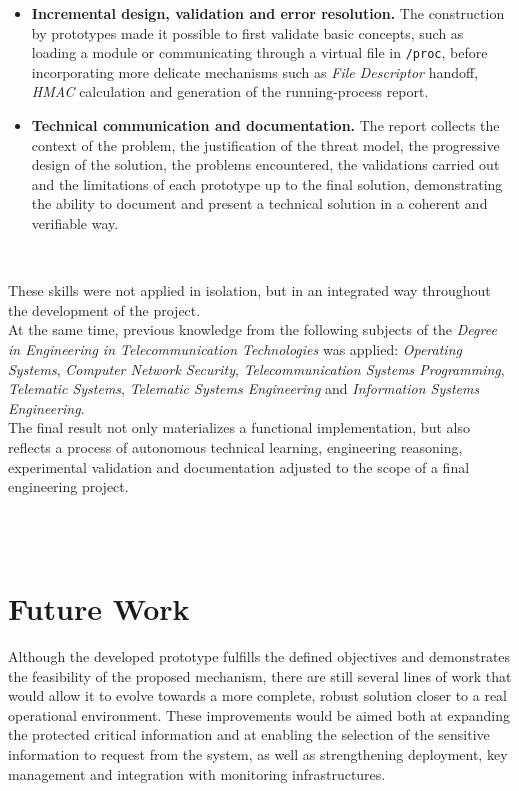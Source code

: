 \begin{itemize}
    \item \textbf{Incremental design, validation and error resolution.} The construction by prototypes made it possible to first validate basic concepts, such as loading a module or communicating through a virtual file in \texttt{/proc}, before incorporating more delicate mechanisms such as \textit{File Descriptor} handoff, \textit{HMAC} calculation and generation of the running-process report.
    
    \item \textbf{Technical communication and documentation.} The report collects the context of the problem, the justification of the threat model, the progressive design of the solution, the problems encountered, the validations carried out and the limitations of each prototype up to the final solution, demonstrating the ability to document and present a technical solution in a coherent and verifiable way.
\end{itemize}

\

These skills were not applied in isolation, but in an integrated way throughout the development of the project.\\

At the same time, previous knowledge from the following subjects of the \textit{Degree in Engineering in Telecommunication Technologies} was applied: \textit{Operating Systems}, \textit{Computer Network Security}, \textit{Telecommunication Systems Programming}, \textit{Telematic Systems}, \textit{Telematic Systems Engineering} and \textit{Information Systems Engineering}.\\

The final result not only materializes a functional implementation, but also reflects a process of autonomous technical learning, engineering reasoning, experimental validation and documentation adjusted to the scope of a final engineering project.\\

\

\

\section{Future Work}

Although the developed prototype fulfills the defined objectives and demonstrates the feasibility of the proposed mechanism, there are still several lines of work that would allow it to evolve towards a more complete, robust solution closer to a real operational environment.
These improvements would be aimed both at expanding the protected critical information and at enabling the selection of the sensitive information to request from the system, as well as strengthening deployment, key management and integration with monitoring infrastructures.\\

